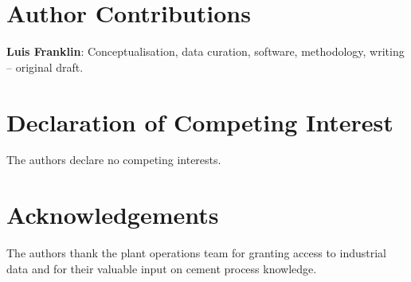 \documentclass[preprint,12pt]{elsarticle}
\begin{document}
\section*{Author Contributions}

\textbf{Luis Franklin}: Conceptualisation, data curation, software,
methodology, writing -- original draft.

\section*{Declaration of Competing Interest}

The authors declare no competing interests.

\section*{Acknowledgements}

The authors thank the plant operations team for granting access to industrial
data and for their valuable input on cement process knowledge.


\end{document}
